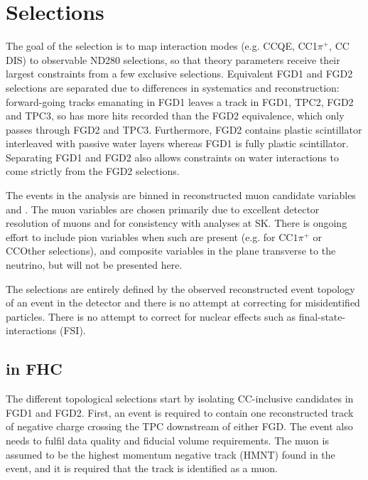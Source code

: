 \section{Selections}
\label{sec:ND280:sel}
The goal of the selection is to map interaction modes (e.g. CCQE, CC1$\pi^+$, CC DIS) to observable ND280 selections, so that theory parameters receive their largest constraints from a few exclusive selections. Equivalent FGD1 and FGD2 selections are separated due to differences in systematics and reconstruction: forward-going tracks emanating in FGD1 leaves a track in FGD1, TPC2, FGD2 and TPC3, so has more hits recorded than the FGD2 equivalence, which only passes through FGD2 and TPC3. Furthermore, FGD2 contains plastic scintillator interleaved with passive water layers whereas FGD1 is fully plastic scintillator. Separating FGD1 and FGD2 also allows constraints on water interactions to come strictly from the FGD2 selections.

The events in the analysis are binned in reconstructed muon candidate variables \pmu and \cosmu. The muon variables are chosen primarily due to excellent detector resolution of muons and for consistency with analyses at SK. There is ongoing effort to include pion variables when such are present (e.g. for CC$1\pi^+$ or CCOther selections), and composite variables in the plane transverse to the neutrino, but will not be presented here.

The selections are entirely defined by the observed reconstructed event topology of an event in the detector and there is no attempt at correcting for misidentified particles. There is no attempt to correct for nuclear effects such as final-state-interactions (FSI).

\subsection{\numu in FHC}
\label{sec:numu_sel}
The different topological selections start by isolating CC-inclusive candidates in FGD1 and FGD2. First, an event is required to contain one reconstructed track of negative charge crossing the TPC downstream of either FGD. The event also needs to fulfil data quality and fiducial volume requirements. The muon is assumed to be the highest momentum negative track (HMNT) found in the event, and it is required that the track is identified as a muon.

